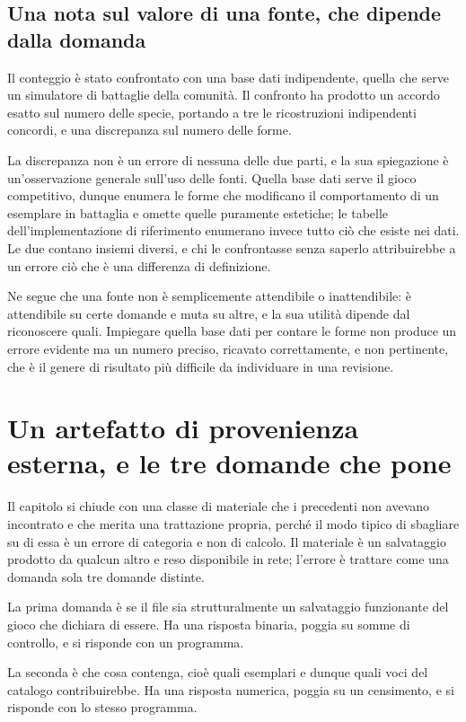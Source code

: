 \subsection*{Una nota sul valore di una fonte, che dipende dalla domanda}

Il conteggio è stato confrontato con una base dati indipendente, quella che serve un simulatore di battaglie della comunità. Il confronto ha prodotto un accordo esatto sul numero delle specie, portando a tre le ricostruzioni indipendenti concordi, e una discrepanza sul numero delle forme.

La discrepanza non è un errore di nessuna delle due parti, e la sua spiegazione è un'osservazione generale sull'uso delle fonti. Quella base dati serve il gioco competitivo, dunque enumera le forme che modificano il comportamento di un esemplare in battaglia e omette quelle puramente estetiche; le tabelle dell'implementazione di riferimento enumerano invece tutto ciò che esiste nei dati. Le due contano insiemi diversi, e chi le confrontasse senza saperlo attribuirebbe a un errore ciò che è una differenza di definizione.

Ne segue che una fonte non è semplicemente attendibile o inattendibile: è attendibile su certe domande e muta su altre, e la sua utilità dipende dal riconoscere quali. Impiegare quella base dati per contare le forme non produce un errore evidente ma un numero preciso, ricavato correttamente, e non pertinente, che è il genere di risultato più difficile da individuare in una revisione.
\section{Un artefatto di provenienza esterna, e le tre domande che pone}

Il capitolo si chiude con una classe di materiale che i precedenti non avevano incontrato e che merita una trattazione propria, perché il modo tipico di sbagliare su di essa è un errore di categoria e non di calcolo. Il materiale è un salvataggio prodotto da qualcun altro e reso disponibile in rete; l'errore è trattare come una domanda sola tre domande distinte.

La prima domanda è se il file sia strutturalmente un salvataggio funzionante del gioco che dichiara di essere. Ha una risposta binaria, poggia su somme di controllo, e si risponde con un programma.

La seconda è che cosa contenga, cioè quali esemplari e dunque quali voci del catalogo contribuirebbe. Ha una risposta numerica, poggia su un censimento, e si risponde con lo stesso programma.

